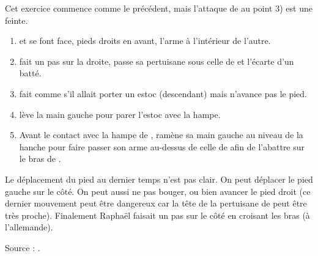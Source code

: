 \begin{exercice}
Cet exercice commence comme le précédent, mais l'attaque de \A au point 3) est une feinte.
\begin{enumerate}
	\item \A et \D se font face, pieds droits en avant, l'arme à l'intérieur de l'autre.
	\item \A fait un pas sur la droite, passe sa pertuisane sous celle de \D et l'écarte d'un batté.
	\item \A fait comme s'il allait porter un estoc (descendant) mais n'avance pas le pied.
	\item \D lève la main gauche pour parer l'estoc avec la hampe.
	\item Avant le contact avec la hampe de \D, \A ramène sa main gauche au niveau de la hanche pour faire passer son arme au-dessus de celle de \D afin de l'abattre sur le bras de \D.
\end{enumerate}

Le déplacement du pied au dernier temps n'est pas clair. On peut déplacer le pied gauche sur le côté. On peut aussi ne pas bouger, ou bien avancer le pied droit (ce dernier mouvement peut être dangereux car la tête de la pertuisane de \D peut être très proche). Finalement Raphaël faisait un pas sur le côté en croisant les bras (à l'allemande).

Source : \cite[expliqué par Paul et Raphaël]{livermore:cornucopia:partizan:2014}.
\end{exercice}

